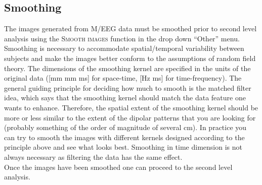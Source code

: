 \subsection{Smoothing}
The images generated from M/EEG data must be smoothed prior to second level analysis using the \textsc{Smooth images} function in the drop down ``Other'' menu. Smoothing is necessary to accommodate spatial/temporal variability between subjects and make the images better conform to the assumptions of random field theory. The dimensions of the smoothing kernel are specified in the units of the original data ([mm mm ms] for space-time, [Hz ms] for time-frequency). The general guiding principle for deciding how much to smooth is the matched filter idea, which says that the smoothing kernel should match the data feature one wants to enhance. Therefore, the spatial extent of the smoothing kernel should be more or less similar to the extent of the dipolar patterns that you are looking for (probably something of the order of magnitude of several cm).  In practice you can try to smooth the images with different kernels designed according to the principle above and see what looks best. Smoothing in time dimension is not always necessary as filtering the data has the same effect.
\\

Once the images have been smoothed one can proceed to the second level analysis.